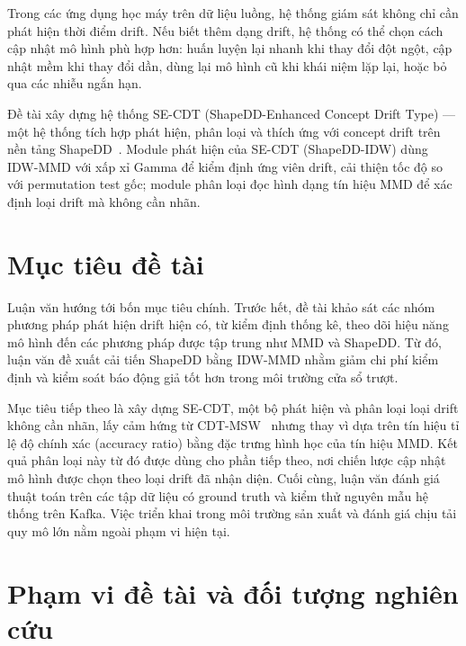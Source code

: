 Trong các ứng dụng học máy trên dữ liệu luồng, hệ thống giám sát không chỉ cần phát hiện thời điểm drift. Nếu biết thêm dạng drift, hệ thống có thể chọn cách cập nhật mô hình phù hợp hơn: huấn luyện lại nhanh khi thay đổi đột ngột, cập nhật mềm khi thay đổi dần, dùng lại mô hình cũ khi khái niệm lặp lại, hoặc bỏ qua các nhiễu ngắn hạn.

Đề tài xây dựng hệ thống SE-CDT (ShapeDD-Enhanced Concept Drift Type) --- một hệ thống tích hợp phát hiện, phân loại và thích ứng với concept drift trên nền tảng ShapeDD~\cite{shapeDD2021}. Module phát hiện của SE-CDT (ShapeDD-IDW) dùng IDW-MMD với xấp xỉ Gamma để kiểm định ứng viên drift, cải thiện tốc độ so với permutation test gốc; module phân loại đọc hình dạng tín hiệu MMD để xác định loại drift mà không cần nhãn.

\section{Mục tiêu đề tài}

Luận văn hướng tới bốn mục tiêu chính. Trước hết, đề tài khảo sát các nhóm phương pháp phát hiện drift hiện có, từ kiểm định thống kê, theo dõi hiệu năng mô hình đến các phương pháp được tập trung như MMD và ShapeDD. Từ đó, luận văn đề xuất cải tiến ShapeDD bằng IDW-MMD nhằm giảm chi phí kiểm định và kiểm soát báo động giả tốt hơn trong môi trường cửa sổ trượt.

Mục tiêu tiếp theo là xây dựng SE-CDT, một bộ phát hiện và phân loại loại drift không cần nhãn, lấy cảm hứng từ CDT-MSW~\cite{guo2022cdtmsw} nhưng thay vì dựa trên tín hiệu tỉ lệ độ chính xác (accuracy ratio) bằng đặc trưng hình học của tín hiệu MMD. Kết quả phân loại này từ đó được dùng cho phần tiếp theo, nơi chiến lược cập nhật mô hình được chọn theo loại drift đã nhận diện. Cuối cùng, luận văn đánh giá thuật toán trên các tập dữ liệu có ground truth và kiểm thử nguyên mẫu hệ thống trên Kafka. Việc triển khai trong môi trường sản xuất và đánh giá chịu tải quy mô lớn nằm ngoài phạm vi hiện tại.

\section{Phạm vi đề tài và đối tượng nghiên cứu}
